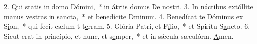 2. Qui statis in domo D\uline{ó}mini,~* in átriis domus De n\uline{o}stri.
3. In nóctibus extóllite manus vestras in s\uline{a}ncta,~* et benedícite Dm\uline{i}num.
4. Benedícat te Dóminus ex S\uline{i}on,~* qui fecit cælum t t\uline{e}rram.
5. Glória Patri, et F\uline{í}lio,~* et Spirítu S\uline{a}ncto.
6. Sicut erat in princípio, et nunc, et s\uline{e}mper,~* et in sǽcula sæculórm. \uline{A}men.
